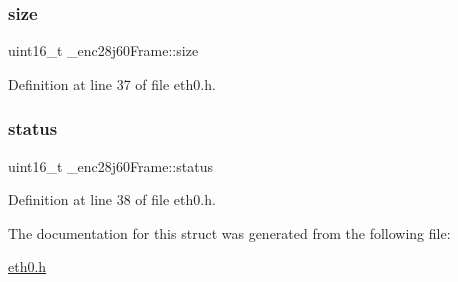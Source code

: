 \subsubsection{\texorpdfstring{size}{size}}
{\footnotesize\ttfamily uint16\+\_\+t \+\_\+enc28j60\+Frame\+::size}



Definition at line 37 of file eth0.\+h.

\mbox{\label{struct__enc28j60Frame_a1833f4cb8b219df481491088095eb1d3}} 
\subsubsection{\texorpdfstring{status}{status}}
{\footnotesize\ttfamily uint16\+\_\+t \+\_\+enc28j60\+Frame\+::status}



Definition at line 38 of file eth0.\+h.



The documentation for this struct was generated from the following file\+:\begin{DoxyCompactItemize}
\item 
\hyperlink{eth0_8h}{eth0.\+h}\end{DoxyCompactItemize}
